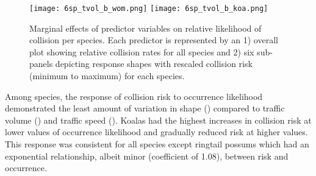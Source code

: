 \begin{figure*}[htp]
{\begin{minipage}[t][][]{.25\textwidth}
    	\vfill
    	\texttt{[image: 6sp\_tvol\_b\_wom.png]}
    	\texttt{[image: 6sp\_tvol\_b\_koa.png]}
    \end{minipage}
  }%
  \caption[Marginal effects of predictor variables on relative likelihood of collision for six mammal species]{Marginal effects of predictor variables on relative likelihood of collision per species. Each predictor is represented by an 1) overall plot showing relative collision rates for all species and 2) six sub-panels depicting response shapes with rescaled collision risk (minimum to maximum) for each species.}
  \label{6sp_effects}
\end{figure*}

Among species, the response of collision risk to occurrence likelihood demonstrated the least amount of variation in shape () compared to traffic volume () and traffic speed (). Koalas had the highest increases in collision risk at lower values of occurrence likelihood and gradually reduced risk at higher values. This response was consistent for all species except ringtail possums which had an exponential relationship, albeit minor (coefficient of 1.08), between risk and occurrence.

